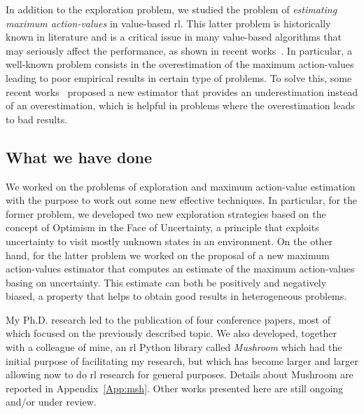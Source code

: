 In addition to the exploration problem, we studied the problem of \textit{estimating maximum action-values} in value-based \gls{rl}. This latter problem is historically known in literature and is a critical issue in many value-based algorithms that may seriously affect the performance, as shown in recent works~\cite{smith2006optimizer}. In particular, a well-known problem consists in the overestimation of the maximum action-values leading to poor empirical results in certain type of problems. To solve this, some recent works~\cite{van2010double, xu2013mab, van2015deep} proposed a new estimator that provides an underestimation instead of an overestimation, which is helpful in problems where the overestimation leads to bad results.

\subsection{What we have done}
We worked on the problems of exploration and maximum action-value estimation with the purpose to work out some new effective techniques. In particular, for the former problem, we developed two new exploration strategies based on the concept of Optimism in the Face of Uncertainty, a principle that exploits uncertainty to visit mostly unknown states in an environment. On the other hand, for the latter problem we worked on the proposal of a new maximum action-values estimator that computes an estimate of the maximum action-values basing on uncertainty. This estimate can both be positively and negatively biased, a property that helps to obtain good results in heterogeneous problems.

My Ph.D. research led to the publication of four conference papers, most of which focused on the previously described topic. We also developed, together with a colleague of mine, an \gls{rl} Python library called \textit{Mushroom} which had the initial purpose of facilitating my research, but which has become larger and larger allowing now to do \gls{rl} research for general purposes. Details about Mushroom are reported in Appendix~\ref{App:msh}. Other works presented here are still ongoing and/or under review.

